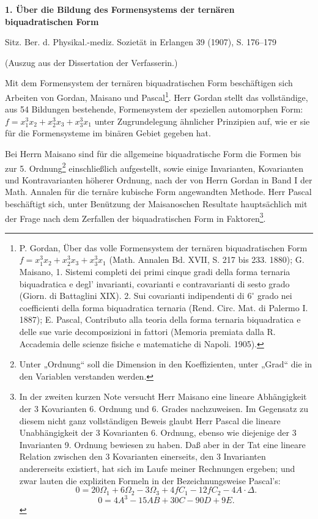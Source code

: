 \documentclass[11pt]{article}
\begin{document}
\begin{center}
{\Large\bfseries 1. Über die Bildung des Formensystems der ternären\\ biquadratischen Form}\par
\vspace{1.5em}
Sitz. Ber. d. Physikal.-mediz. Sozietät in Erlangen 39 (1907), S. 176--179
\end{center}

\vspace{4em}
\begin{center}
(Auszug aus der Dissertation der Verfasserin.)
\end{center}

Mit dem Formensystem der ternären biquadratischen Form beschäftigen sich Arbeiten von Gordan, Maisano und Pascal\footnote{P. Gordan, Über das volle Formensystem der ternären biquadratischen Form $f=x_1^3x_2+x_2^3x_3+x_3^3x_1$ (Math. Annalen Bd. XVII, S. 217 bis 233. 1880); G. Maisano, 1. Sistemi completi dei primi cinque gradi della forma ternaria biquadratica e degl' invarianti, covarianti e contravarianti di sesto grado (Giorn. di Battaglini XIX). 2. Sui covarianti indipendenti di $6^\circ$ grado nei coefficienti della forma biquadratica ternaria (Rend. Circ. Mat. di Palermo I. 1887); E. Pascal, Contributo alla teoria della forma ternaria biquadratica e delle sue varie decomposizioni in fattori (Memoria premiata dalla R. Accademia delle scienze fisiche e matematiche di Napoli. 1905).}. Herr Gordan stellt das vollständige, aus 54 Bildungen bestehende, Formensystem der speziellen automorphen Form: $f=x_1^3x_2+x_2^3x_3+x_3^3x_1$ unter Zugrundelegung ähnlicher Prinzipien auf, wie er sie für die Formensysteme im binären Gebiet gegeben hat.

Bei Herrn Maisano sind für die allgemeine biquadratische Form die Formen bis zur 5. Ordnung\footnote{Unter „Ordnung“ soll die Dimension in den Koeffizienten, unter „Grad“ die in den Variablen verstanden werden.} einschließlich aufgestellt, sowie einige Invarianten, Kovarianten und Kontravarianten höherer Ordnung, nach der von Herrn Gordan in Band I der Math. Annalen für die ternäre kubische Form angewandten Methode. Herr Pascal beschäftigt sich, unter Benützung der Maisanoschen Resultate hauptsächlich mit der Frage nach dem Zerfallen der biquadratischen Form in Faktoren\footnote{In der zweiten kurzen Note versucht Herr Maisano eine lineare Abhängigkeit der 3 Kovarianten 6. Ordnung und 6. Grades nachzuweisen. Im Gegensatz zu diesem nicht ganz vollständigen Beweis glaubt Herr Pascal die lineare Unabhängigkeit der 3 Kovarianten 6. Ordnung, ebenso wie diejenige der 3 Invarianten 9. Ordnung bewiesen zu haben. Daß aber in der Tat eine lineare Relation zwischen den 3 Kovarianten einerseits, den 3 Invarianten andererseits existiert, hat sich im Laufe meiner Rechnungen ergeben; und zwar lauten die expliziten Formeln in der Bezeichnungsweise Pascal's:
\[
0=20\Omega_1+6\Omega_2-3\Omega_3+4fC_1-12fC_2-4A\cdot\Delta.
\]
\[
0=4A^3-15AB+30C-90D+9E.
\]}. 
\end{document}
